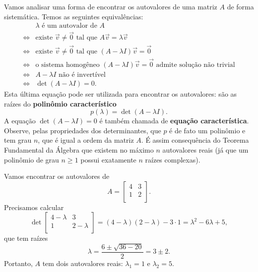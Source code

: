 Vamos analisar uma forma de encontrar os autovalores de uma matriz $A$ de forma sistemática. Temos as seguintes equivalências:
\begin{align*}
& \lambda \text{ é um autovalor de $A$} \\
\iff & \text{existe } \vec{v} \neq \vec{0} \text{ tal que } A \vec{v} = \lambda \vec{v} \\
\iff & \text{existe } \vec{v} \neq \vec{0} \text{ tal que } (A - \lambda I)\vec{v} = \vec{0} \\
\iff & \text{o sistema homogêneo } (A - \lambda I)\vec{v} = \vec{0} \text{ admite solução não trivial} \\
\iff & A - \lambda I \text{ não é invertível} \\
\iff & \det (A - \lambda I) = 0.
\end{align*}
Esta última equação pode ser utilizada para encontrar os autovalores: são as raízes do \textbf{polinômio característico}
\begin{equation}
p(\lambda) = \det (A - \lambda I).
\end{equation} A equação $\det (A - \lambda I) = 0$ é também chamada de \textbf{equação característica}. Observe, pelas propriedades dos determinantes, que $p$ é de fato um polinômio e tem grau $n$, que é igual a ordem da matriz $A$. É assim consequência do Teorema Fundamental da Álgebra que existem no máximo $n$ autovalores reais (já que um polinômio de grau $n\ge 1$ possui exatamente $n$ raízes complexas).


\begin{ex}\label{2x2}
	Vamos encontrar os autovalores de
	\begin{equation}
	A =
	\left[
	\begin{array}{cc}
	4 & 3 \\
	1 & 2 \\
	\end{array}
	\right].
	\end{equation} Precisamos calcular
	\begin{equation}
	\det\left[
	\begin{array}{cc}
	4-\lambda & 3 \\
	1 & 2-\lambda \\
	\end{array}
	\right] = (4-\lambda)(2-\lambda) - 3 \cdot 1 = \lambda^2 -6\lambda + 5,
	\end{equation} que tem raízes
	\begin{equation}
	\lambda = \frac{6 \pm \sqrt{36 - 20}}{2} = 3 \pm 2.
	\end{equation} Portanto, $A$ tem dois autovalores reais: $\lambda_1 = 1$ e $\lambda_2 = 5$.
\end{ex}


